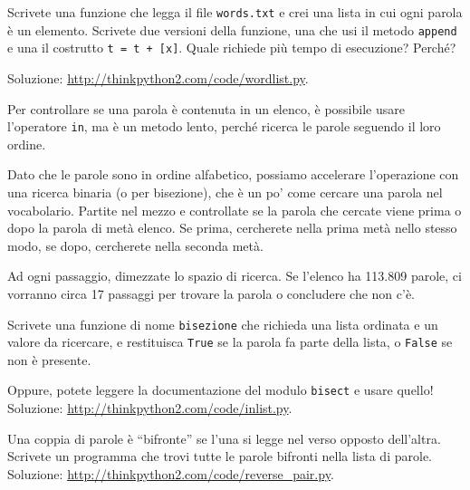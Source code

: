 \documentclass[10pt]{book}
\begin{document}
\vspace{0.2in}
\begin{exercise}

Scrivete una funzione che legga il file {\tt words.txt} e crei una lista in cui ogni parola è un elemento. Scrivete due versioni della funzione, una che usi il metodo {\tt append} e una il costrutto {\tt t = t + [x]}. Quale richiede più tempo di esecuzione? Perché?

Soluzione: \url{http://thinkpython2.com/code/wordlist.py}.

\end{exercise}

\vspace{0.2in}
\begin{exercise}
\label{wordlist1}
\label{bisection}

Per controllare se una parola è contenuta in un elenco, è possibile usare l'operatore {\tt in}, ma è un metodo lento, perché ricerca le parole seguendo il loro ordine.

Dato che le parole sono in ordine alfabetico, possiamo accelerare l'operazione con una ricerca binaria (o per bisezione), che è un po' come cercare una parola nel vocabolario.
Partite nel mezzo e controllate se la parola che cercate viene prima o dopo la parola di metà elenco. Se prima, cercherete nella prima metà nello stesso modo, se dopo, cercherete nella seconda metà.

Ad ogni passaggio, dimezzate lo spazio di ricerca. Se l'elenco ha 113.809 parole, ci vorranno circa 17 passaggi per trovare la parola o concludere che non c'è.

Scrivete una funzione di nome {\tt bisezione} che richieda una lista ordinata e un valore da ricercare, e restituisca {\tt True} se la parola fa parte della lista, o {\tt False} se non è presente.

Oppure, potete leggere la documentazione del modulo {\tt bisect} e usare quello!  Soluzione: \url{http://thinkpython2.com/code/inlist.py}.

\end{exercise}

\vspace{0.2in}
\begin{exercise}

Una coppia di parole è ``bifronte'' se l'una si legge nel verso opposto dell'altra. Scrivete un programma che trovi tutte le parole bifronti nella lista di parole.  Soluzione: \url{http://thinkpython2.com/code/reverse_pair.py}.

\end{exercise}
\end{document}

